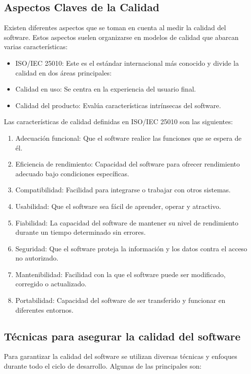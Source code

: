 \documentclass[12pt]{article}
\begin{document}
\subsection*{Aspectos Claves de la Calidad}
Existen diferentes aspectos que se toman en cuenta al medir la calidad del software. Estos aspectos suelen organizarse en modelos de calidad que abarcan varias características:

\begin{itemize}
    \item ISO/IEC 25010: Este es el estándar internacional más conocido y divide la calidad en dos áreas principales:
    \item Calidad en uso: Se centra en la experiencia del usuario final.
    \item Calidad del producto: Evalúa características intrínsecas del software.
\end{itemize}
Las características de calidad definidas en ISO/IEC 25010 son las siguientes:
\begin{enumerate}
    \item Adecuación funcional: Que el software realice las funciones que se espera de él.
    \item Eficiencia de rendimiento: Capacidad del software para ofrecer rendimiento adecuado bajo condiciones específicas.
    \item Compatibilidad: Facilidad para integrarse o trabajar con otros sistemas.
    \item Usabilidad: Que el software sea fácil de aprender, operar y atractivo.
    \item Fiabilidad: La capacidad del software de mantener su nivel de rendimiento durante un tiempo determinado sin errores.
    \item Seguridad: Que el software proteja la información y los datos contra el acceso no autorizado.
    \item Mantenibilidad: Facilidad con la que el software puede ser modificado, corregido o actualizado.
    \item Portabilidad: Capacidad del software de ser transferido y funcionar en diferentes entornos.
\end{enumerate}



\subsection*{Técnicas para asegurar la calidad del software}
Para garantizar la calidad del software se utilizan diversas técnicas y enfoques durante todo el ciclo de desarrollo. Algunas de las principales son:
\end{document}
